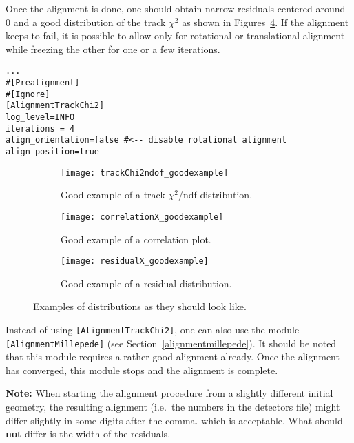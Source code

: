 Once the alignment is done, one should obtain narrow residuals centered around 0 and a good distribution of the track $\chi^2$ as shown in Figures~\ref{fig:exampleAlignment}.
If the alignment keeps to fail, it is possible to allow only for rotational or translational alignment while freezing the other for one or a few iterations.

\begin{verbatim}
...
#[Prealignment]
#[Ignore]
[AlignmentTrackChi2]
log_level=INFO
iterations = 4
align_orientation=false #<-- disable rotational alignment
align_position=true
\end{verbatim}

\begin{figure}
    \centering
    \begin{subfigure}[t]{0.66\textwidth}
        \texttt{[image: trackChi2ndof\_goodexample]}
        \caption{Good example of a track $\chi^2$/ndf distribution.}
        \label{fig:trackChi2}
    \end{subfigure}
    \begin{subfigure}[t]{0.66\textwidth}
        \texttt{[image: correlationX\_goodexample]}
        \caption{Good example of a correlation plot.}
        \label{fig:correlationX}
    \end{subfigure}
    \begin{subfigure}[t]{0.66\textwidth}
        \texttt{[image: residualX\_goodexample]}
        \caption{Good example of a residual distribution.}
        \label{fig:residualX}
    \end{subfigure}
    \caption{Examples of distributions as they should look like.}
    \label{fig:exampleAlignment}
\end{figure}

Instead of using \texttt{[AlignmentTrackChi2]}, one can also use the module \texttt{[AlignmentMillepede]} (see Section~\ref{alignmentmillepede}).
It should be noted that this module requires a rather good alignment already.
Once the alignment has converged, this module stops and the alignment is complete.

\begin{warning}
\textbf{Note:} When starting the alignment procedure from a slightly different initial geometry, the resulting alignment (i.e.~the numbers in the detectors file) might differ slightly in some digits after the comma. which is acceptable. What should \textbf{not} differ is the width of the residuals.
\end{warning}

